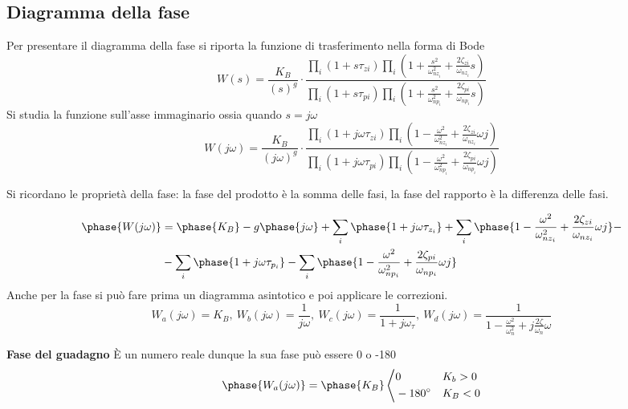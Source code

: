 \subsection{Diagramma della fase}
Per presentare il diagramma della fase si riporta la funzione di trasferimento
nella forma di Bode
$$
W(s) = \frac{K_B}{(s)^g}\cdot \frac{\prod_i (1+s \tau_{zi})
\prod_i \left(1+\frac{s^2}{\omega_{nz_i}^2} +
\frac{2\zeta_{zi}}{\omega_{nz_i}}s\right) }
{\prod_i (1+s \tau_{pi})
\prod_i \left(1+\frac{s^2}{\omega_{np_i}^2} +
\frac{2\zeta_{pi}}{\omega_{np_i}}s\right) }
$$
Si studia la funzione sull'asse immaginario ossia quando $s=j\omega$
$$
W({j\omega}) = \frac{K_B}{({j\omega})^g}\cdot \frac{\prod_i (1+{j\omega}
\tau_{zi})
\prod_i \left(1-\frac{\omega^2}{\omega_{nz_i}^2} +
\frac{2\zeta_{zi}}{\omega_{nz_i}}\omega j\right) }
{\prod_i (1+{j\omega} \tau_{pi})
\prod_i \left(1-\frac{\omega^2}{\omega_{np_i}^2} +
\frac{2\zeta_{pi}}{\omega_{np_i}}\omega j\right) }$$

Si ricordano le proprietà della fase: la fase del prodotto è la somma delle
fasi, la fase del rapporto è la differenza delle fasi.

$$\begin{aligned}
\phase{W(j\omega)} &= \phase{K_B} - g\phase{j\omega} +
\sum_i\phase{1+j\omega\tau_{z_i}} +
\sum_i\phase{1-\frac{\omega^2}{\omega_{nz_i}^2}+\frac{2\zeta_{zi}}{\omega_{nz_i}
}\omega j} - \\
&-\sum_i\phase{1+j\omega\tau_{p_i}} -
\sum_i\phase{1-\frac{\omega^2}{\omega_{np_i}^2} +
\frac{2\zeta_{pi}}{\omega_{np_i}}\omega j}
\end{aligned}$$
Anche per la fase si può fare prima un diagramma asintotico e poi applicare le
correzioni.
$$
W_a(j\omega) = K_B,\ W_b(j\omega) = \frac{1}{j\omega},\
W_c(j\omega)=\frac{1}{1+j\omega_\tau},\ W_d(j\omega) =
\frac{1}{1-\frac{\omega^2}{\omega_n^2}+j\frac{2\zeta}{\omega_n}\omega}
$$

\textbf{Fase del guadagno} \`E un numero reale dunque la sua fase può essere 0
o -180\textdegree
$$
\phase{W_a(j\omega)} = \phase{K_B} \left\langle
\begin{aligned}
& 0 & & K_b > 0 \\
& \SI{-180}{\degree} & & K_B <0
\end{aligned}\right.
$$
\begin{figure}[h]
\centering
{}
\end{figure}

